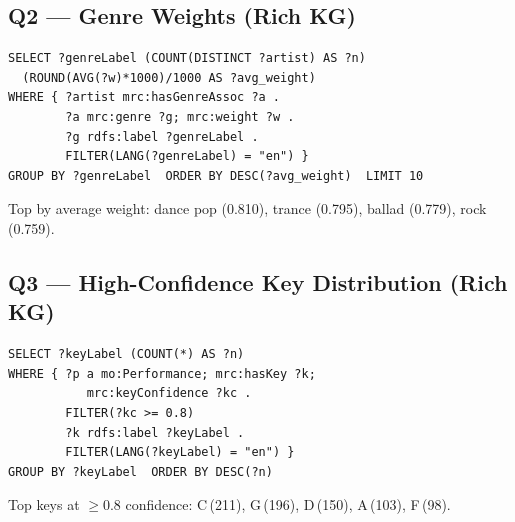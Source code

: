 \subsection*{Q2 — Genre Weights (Rich KG)}
\begin{footnotesize}
\begin{verbatim}
SELECT ?genreLabel (COUNT(DISTINCT ?artist) AS ?n)
  (ROUND(AVG(?w)*1000)/1000 AS ?avg_weight)
WHERE { ?artist mrc:hasGenreAssoc ?a .
        ?a mrc:genre ?g; mrc:weight ?w .
        ?g rdfs:label ?genreLabel .
        FILTER(LANG(?genreLabel) = "en") }
GROUP BY ?genreLabel  ORDER BY DESC(?avg_weight)  LIMIT 10
\end{verbatim}
\end{footnotesize}

\noindent Top by average weight: dance pop (0.810), trance (0.795), ballad (0.779), rock (0.759).

\subsection*{Q3 — High-Confidence Key Distribution (Rich KG)}
\begin{footnotesize}
\begin{verbatim}
SELECT ?keyLabel (COUNT(*) AS ?n)
WHERE { ?p a mo:Performance; mrc:hasKey ?k;
           mrc:keyConfidence ?kc .
        FILTER(?kc >= 0.8)
        ?k rdfs:label ?keyLabel .
        FILTER(LANG(?keyLabel) = "en") }
GROUP BY ?keyLabel  ORDER BY DESC(?n)
\end{verbatim}
\end{footnotesize}

\noindent Top keys at $\geq$0.8 confidence: C\,(211), G\,(196), D\,(150), A\,(103), F\,(98).
